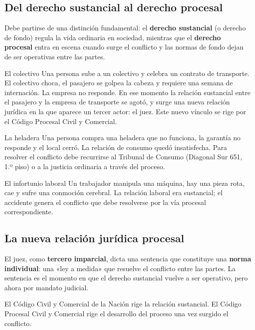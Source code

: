 \documentclass[12pt,oneside]{book}
\begin{document}
\subsection{Del derecho sustancial al derecho procesal}

Debe partirse de una distinción fundamental: el \textbf{derecho sustancial} (o derecho de fondo) regula la vida ordinaria en sociedad, mientras que el \textbf{derecho procesal} entra en escena cuando surge el conflicto y las normas de fondo dejan de ser operativas entre las partes.

\begin{example}{El colectivo}
Una persona sube a un colectivo y celebra un contrato de transporte. El colectivo choca, el pasajero se golpea la cabeza y requiere una semana de internación. La empresa no responde. En ese momento la relación sustancial entre el pasajero y la empresa de transporte se agotó, y surge una nueva relación jurídica en la que aparece un tercer actor: el juez. Este nuevo vínculo se rige por el Código Procesal Civil y Comercial.
\end{example}

\begin{example}{La heladera}
Una persona compra una heladera que no funciona, la garantía no responde y el local cerró. La relación de consumo quedó insatisfecha. Para resolver el conflicto debe recurrirse al Tribunal de Consumo (Diagonal Sur 651, 1.º piso) o a la justicia ordinaria a través del proceso.
\end{example}

\begin{example}{El infortunio laboral}
Un trabajador manipula una máquina, hay una pieza rota, cae y sufre una conmoción cerebral. La relación laboral era sustancial; el accidente genera el conflicto que debe resolverse por la vía procesal correspondiente.
\end{example}

\subsection{La nueva relación jurídica procesal}

El juez, como \textbf{tercero imparcial}, dicta una sentencia que constituye una \textbf{norma individual}: una «ley a medida» que resuelve el conflicto entre las partes. La sentencia es el momento en que el derecho sustancial vuelve a ser operativo, pero ahora por mandato judicial.

\begin{important}
El Código Civil y Comercial de la Nación rige la relación sustancial. El Código Procesal Civil y Comercial rige el desarrollo del proceso una vez surgido el conflicto.
\end{important}
\end{document}
